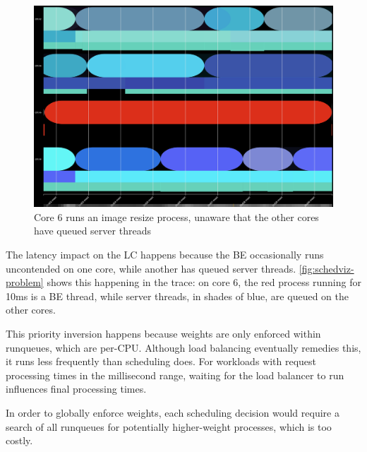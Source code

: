 \begin{figure}[t]
    \centering
    \includegraphics[width=\columnwidth]{graphs/schedviz-problem.png}
    \caption{Core 6 runs an image resize process, unaware that the other cores
    have queued server threads}\label{fig:schedviz-problem}
\end{figure}

The latency impact on the LC happens because the BE occasionally runs
uncontended on one core, while another has queued server threads.
\autoref{fig:schedviz-problem} shows this happening in the trace: on core 6, the
red process running for 10ms is a BE thread, while server threads, in shades of
blue, are queued on the other cores.

This priority inversion happens because weights are only enforced within
runqueues, which are per-CPU. Although load balancing eventually remedies this,
it runs less frequently than scheduling does. For workloads with request
processing times in the millisecond range, waiting for the load balancer to run
influences final processing times.

In order to globally enforce weights, each scheduling decision would require a
search of all runqueues for potentially higher-weight processes, which is too
costly. 




